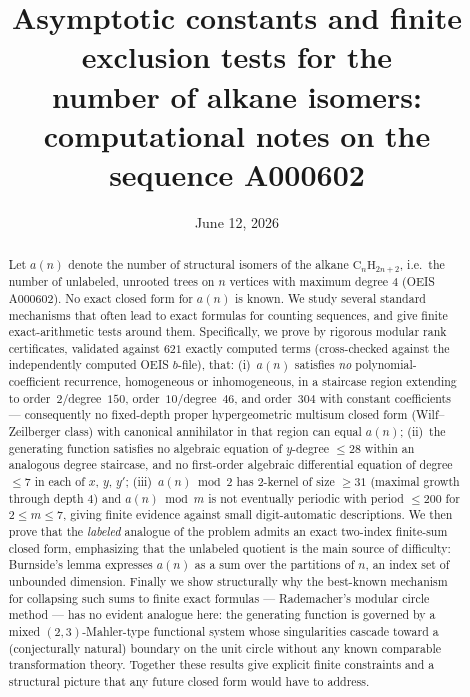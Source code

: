 \documentclass[11pt]{article}
\title{Asymptotic constants and finite exclusion tests for the\\
number of alkane isomers:\\
\large computational notes on the sequence A000602}
\author{}
\date{June 12, 2026}
\theoremstyle{definition}
\newcommand{\seqA}{\textnormal{A000602}}
\begin{document}
\maketitle

\begin{abstract}
Let $a(n)$ denote the number of structural isomers of the alkane
$\mathrm{C}_n\mathrm{H}_{2n+2}$, i.e.\ the number of unlabeled, unrooted trees on
$n$ vertices with maximum degree $4$ (OEIS \seqA). No exact closed form for
$a(n)$ is known. We study several standard mechanisms that often lead to exact
formulas for counting sequences, and give finite exact-arithmetic tests around
them. Specifically, we prove by rigorous modular
rank certificates, validated against $621$ exactly computed terms (cross-checked
against the independently computed OEIS $b$-file), that: (i)~$a(n)$ satisfies
\emph{no} polynomial-coefficient recurrence, homogeneous or inhomogeneous, in a
staircase region extending to order~$2$/degree~$150$, order~$10$/degree~$46$,
and order~$304$ with constant coefficients --- consequently no fixed-depth proper
hypergeometric multisum closed form (Wilf--Zeilberger class) with canonical
annihilator in that region can equal $a(n)$; (ii)~the generating function
satisfies no algebraic equation of $y$-degree $\le 28$ within an analogous degree
staircase, and no first-order algebraic differential equation of degree $\le 7$
in each of $x$, $y$, $y'$; (iii)~$a(n)\bmod 2$ has $2$-kernel of size $\ge 31$
(maximal growth through depth $4$) and $a(n)\bmod m$ is not eventually periodic
with period $\le 200$ for $2\le m\le 7$, giving finite evidence against small
digit-automatic descriptions.
We then prove that the \emph{labeled} analogue of the problem admits an exact
two-index finite-sum closed form, emphasizing that the unlabeled quotient is the
main source of difficulty: Burnside's lemma expresses $a(n)$ as a sum over the
partitions of $n$, an index set of unbounded dimension. Finally we show
structurally why the best-known mechanism for collapsing such sums to finite
exact formulas --- Rademacher's modular circle method --- has no evident
analogue here: the generating function is governed by a mixed
$(2,3)$-Mahler-type functional system whose singularities cascade toward a
(conjecturally natural) boundary on the unit circle without any known comparable
transformation theory. Together these results give explicit finite constraints
and a structural picture that any future closed form would have to address.
\end{abstract}
\end{document}
